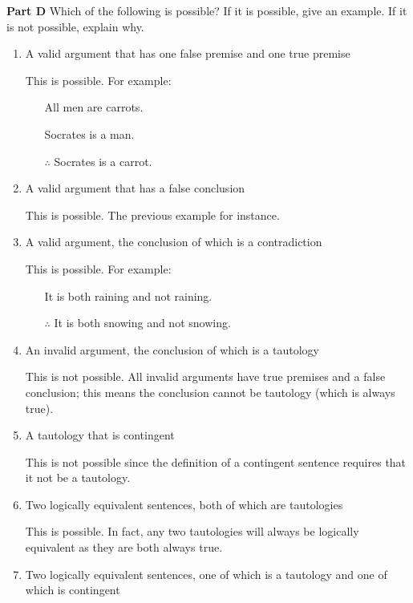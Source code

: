 \documentclass[12pt, letterpaper, twoside]{article}
\begin{document}
\noindent \textbf{Part D} Which of the following is
possible? If it is possible, give an example. If it is not
possible, explain why.
\begin{enumerate}
    \item A valid argument that has one false premise and
      one true premise

    This is possible. For example:
    \begin{enumerate}
        \item[] All men are carrots.
        \item[] Socrates is a man.
        \item[$\therefore$] Socrates is a carrot.
    \end{enumerate}

    \item A valid argument that has a false conclusion

    This is possible. The previous example for instance.

    \item A valid argument, the conclusion of which is a
      contradiction

    This is possible. For example:
    \begin{enumerate}
        \item[] It is both raining and not raining.
        \item[$\therefore$] It is both snowing and not
          snowing.
    \end{enumerate}

    \item An invalid argument, the conclusion of which is a
      tautology

    This is not possible. All invalid arguments have true
    premises and a false conclusion; this means the
    conclusion cannot be tautology (which is always true).

    \item A tautology that is contingent

    This is not possible since the definition of a
    contingent sentence requires that it not be a tautology.

    \item Two logically equivalent sentences, both of which
      are tautologies

    This is possible. In fact, any two tautologies will
    always be logically equivalent as they are both always
    true.

    \item Two logically equivalent sentences, one of which
      is a tautology and one of which is contingent


\end{enumerate}
\end{document}

